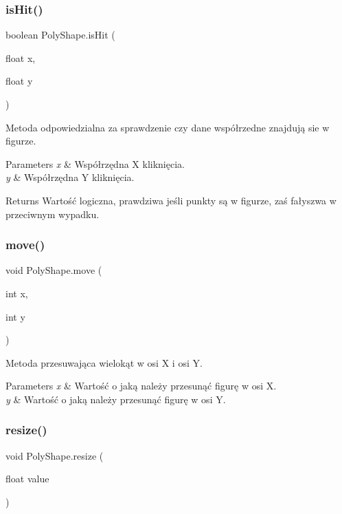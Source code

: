 \subsubsection{is\+Hit()}
{\footnotesize\ttfamily boolean Poly\+Shape.\+is\+Hit (\begin{DoxyParamCaption}\item[{float}]{x,  }\item[{float}]{y }\end{DoxyParamCaption})}

Metoda odpowiedzialna za sprawdzenie czy dane współrzedne znajdują sie w figurze. 
\begin{DoxyParams}{Parameters}
{\em x} & Współrzędna X kliknięcia. \\
\hline
{\em y} & Współrzędna Y kliknięcia. \\
\hline
\end{DoxyParams}
\begin{DoxyReturn}{Returns}
Wartość logiczna, prawdziwa jeśli punkty są w figurze, zaś fałyszwa w przeciwnym wypadku. 
\end{DoxyReturn}
\mbox{\label{class_poly_shape_a8e0760e4b7e078bd5db185f5c09c7158}} 
\subsubsection{move()}
{\footnotesize\ttfamily void Poly\+Shape.\+move (\begin{DoxyParamCaption}\item[{int}]{x,  }\item[{int}]{y }\end{DoxyParamCaption})}

Metoda przesuwająca wielokąt w osi X i osi Y. 
\begin{DoxyParams}{Parameters}
{\em x} & Wartość o jaką należy przesunąć figurę w osi X. \\
\hline
{\em y} & Wartość o jaką należy przesunąć figurę w osi Y. \\
\hline
\end{DoxyParams}
\mbox{\label{class_poly_shape_ae62899d2851dbd8156b9d4162807fe30}} 
\subsubsection{resize()}
{\footnotesize\ttfamily void Poly\+Shape.\+resize (\begin{DoxyParamCaption}\item[{float}]{value }\end{DoxyParamCaption})}

